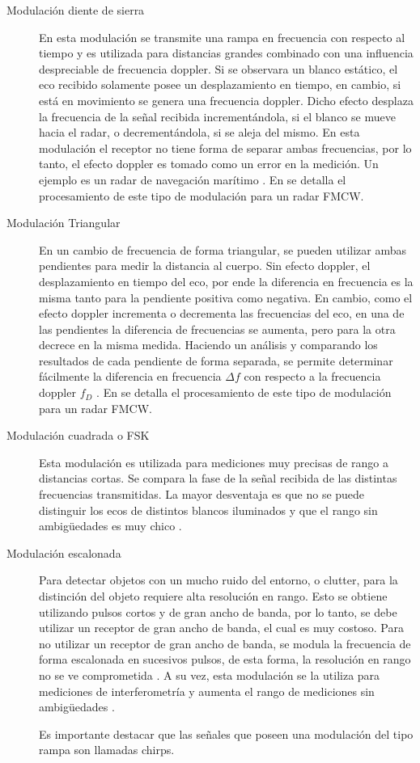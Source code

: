 \begin{description}

\item[Modulación diente de sierra] En esta modulación se transmite una rampa en frecuencia con respecto al tiempo y es utilizada para distancias grandes combinado con una influencia despreciable de frecuencia doppler. Si se observara un blanco estático, el eco recibido solamente posee un desplazamiento en tiempo, en cambio, si está en movimiento se genera una frecuencia doppler. Dicho efecto desplaza la frecuencia de la señal recibida incrementándola, si el blanco se mueve hacia el radar, o decrementándola, si se aleja del mismo. En esta modulación el receptor no tiene forma de separar ambas frecuencias, por lo tanto, el efecto doppler es tomado como un error en la medición. Un ejemplo es un radar de navegación marítimo \cite{Basics2015}. En \cite{Varavin2007a, Shen} se detalla el procesamiento de este tipo de modulación para un radar FMCW.

\item[Modulación Triangular] En un cambio de frecuencia de forma triangular, se pueden utilizar ambas pendientes para medir la distancia al cuerpo. Sin efecto doppler, el desplazamiento en tiempo del eco, por ende la diferencia en frecuencia es la misma tanto para la pendiente positiva como negativa. En cambio, como el efecto doppler incrementa o decrementa las frecuencias del eco, en una de las pendientes la diferencia de frecuencias se aumenta, pero para la otra decrece en la misma medida. Haciendo un análisis y comparando los resultados de cada pendiente de forma separada, se permite determinar fácilmente la diferencia en frecuencia $\Delta f$ con respecto a la frecuencia doppler $f_D$ \cite{Basics2015}. En \cite{Chang2006, Kurt2007} se detalla el procesamiento de este tipo de modulación para un radar FMCW.

\item[Modulación cuadrada o FSK] Esta modulación es utilizada para mediciones muy precisas de rango a distancias cortas. Se compara la fase de la señal recibida de las distintas frecuencias transmitidas. La mayor desventaja es que no se puede distinguir los ecos de distintos blancos iluminados y que el rango sin ambigüedades es muy chico \cite{Basics2015}.

\item[Modulación escalonada] Para detectar objetos con un mucho ruido del entorno, o clutter, para la distinción del objeto requiere alta resolución en rango. Esto se obtiene utilizando pulsos cortos y de gran ancho de banda, por lo tanto, se debe utilizar un receptor de gran ancho de banda, el cual es muy costoso. Para no utilizar un receptor de gran ancho de banda, se modula la frecuencia de forma escalonada en sucesivos pulsos, de esta forma, la resolución en rango no se ve comprometida \cite{steppedFreq}. A su vez, esta modulación se la utiliza para mediciones de interferometría y aumenta el rango de mediciones sin ambigüedades \cite{Basics2015}.

Es importante destacar que las señales que poseen una modulación del tipo rampa son llamadas chirps.

\end{description}

